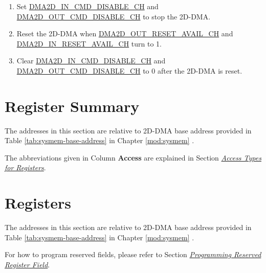 \documentclass[main\_\_EN.tex]{subfiles}
\begin{document}
\begin{enumerate}
    \item Set \hyperref[fielddesc:DMA2DINCMDDISABLECHN]{DMA2D\_IN\_CMD\_DISABLE\_CH} and \hyperref[fielddesc:DMA2DOUTCMDDISABLECHN]{DMA2D\_OUT\_CMD\_DISABLE\_CH} to stop the 2D-DMA.
    \item Reset the 2D-DMA when \hyperref[fielddesc:DMA2DOUTRESETAVAILCHN]{DMA2D\_OUT\_RESET\_AVAIL\_CH} and \hyperref[fielddesc:DMA2DINRESETAVAILCHN]{DMA2D\_IN\_RESET\_AVAIL\_CH} turn to 1.
    \item Clear \hyperref[fielddesc:DMA2DINCMDDISABLECHN]{DMA2D\_IN\_CMD\_DISABLE\_CH} and \hyperref[fielddesc:DMA2DOUTCMDDISABLECHN]{DMA2D\_OUT\_CMD\_DISABLE\_CH} to 0 after the 2D-DMA is reset.
\end{enumerate}



\newpage
\begin{landscape}

\hypertarget{2ddma-reg-summ}{}
\section{Register Summary}
\label{sec:2ddma-reg-summ}

The addresses in this section are relative to 2D-DMA base address provided in Table \ref{tab:sysmem-base-address} in Chapter \ref{mod:sysmem} \textit{}.

The abbreviations given in Column \textbf{Access} are explained in Section \hyperref[glossary-access-types]{\textit{Access Types for Registers}}.

\end{landscape}


\newpage
\section{Registers}

The addresses in this section are relative to 2D-DMA base address provided in Table \ref{tab:sysmem-base-address} in Chapter \ref{mod:sysmem} \textit{}.

For how to program reserved fields, please refer to Section \hyperref[programming-reserved-field]{\textit{Programming Reserved Register Field}}.

\end{document}
